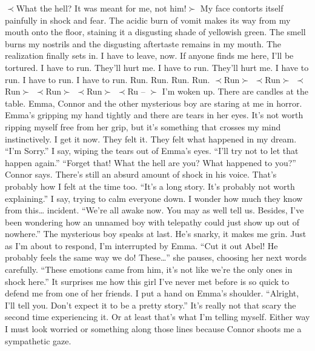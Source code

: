 \documentclass[openany, 12pt]{book}
\newcommand\tab[1][1cm]{\hspace*{#1}}
\begin{document}
$\prec$What the hell? It was meant for me, not him!$\succ$\newline
\tab
My face contorts itself painfully in shock and fear. The acidic burn of vomit makes its way from my mouth onto the floor, staining it a disgusting shade of yellowish green. The smell burns my nostrils and the disgusting aftertaste remains in my mouth. The realization finally sets in. I have to leave, now. If anyone finds me here, I’ll be tortured. I have to run. They’ll hurt me. I have to run. They’ll hurt me. I have to run. I have to run. I have to run. Run. Run. Run. Run.\newline
$\prec$Run$\succ$ $\prec$Run$\succ$ $\prec$Run$\succ$\newline
\tab$\prec$Run$\succ$ $\prec$Run$\succ$ $\prec$Ru -- $\succ$\newline
\tab
I’m woken up. There are candles at the table. Emma, Connor and the other mysterious boy are staring at me in horror. Emma’s gripping my hand tightly and there are tears in her eyes. It’s not worth ripping myself free from her grip, but it’s something that crosses my mind instinctively.\newline
\tab
I get it now. They felt it. They felt what happened in my dream. ``I’m Sorry.'' I say, wiping the tears out of Emma’s eyes. ``I’ll try not to let that happen again.''\newline
\tab
``Forget that! What the hell are you? What happened to you?'' Connor says. There’s still an absurd amount of shock in his voice. That’s probably how I felt at the time too.\newline
\tab
``It’s a long story. It’s probably not worth explaining.'' I say, trying to calm everyone down. I wonder how much they know from this… incident.\newline
\tab
``We’re all awake now. You may as well tell us. Besides, I’ve been wondering how an unnamed boy with telepathy could just show up out of nowhere.'' The mysterious boy speaks at last. He’s snarky, it makes me grin.\newline
\tab
Just as I’m about to respond, I’m interrupted by Emma. ``Cut it out Abel! He probably feels the same way we do! These…'' she pauses, choosing her next words carefully. ``These emotions came from him, it’s not like we’re the only ones in shock here.'' It surprises me how this girl I’ve never met before is so quick to defend me from one of her friends. I put a hand on Emma’s shoulder.\newline
\tab
``Alright, I’ll tell you. Don’t expect it to be a pretty story.'' It’s really not that scary the second time experiencing it. Or at least that’s what I’m telling myself. Either way I must look worried or something along those lines because Connor shoots me a sympathetic gaze.\newline
\end{document}
